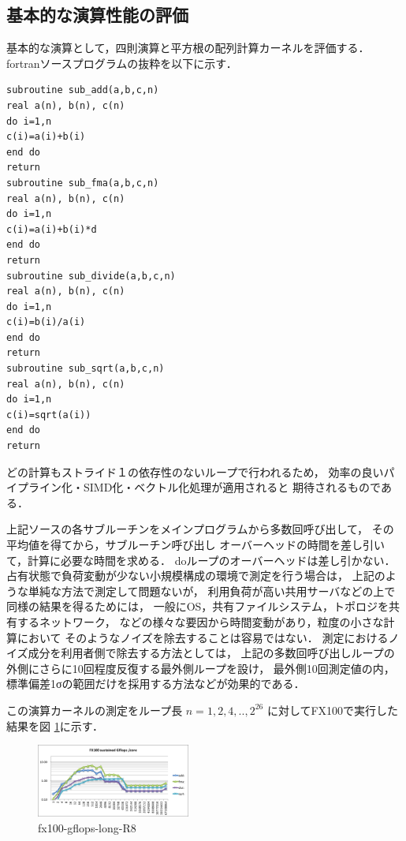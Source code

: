 \documentclass[submit,techrep,noauthor]{ipsj}
\begin{document}
\subsection{基本的な演算性能の評価}

基本的な演算として，四則演算と平方根の配列計算カーネルを評価する．
fortranソースプログラムの抜粋を以下に示す．

\begin{lstlisting}
subroutine sub_add(a,b,c,n)
real a(n), b(n), c(n)  
do i=1,n
c(i)=a(i)+b(i)
end do
return
subroutine sub_fma(a,b,c,n)
real a(n), b(n), c(n)  
do i=1,n
c(i)=a(i)+b(i)*d
end do
return
subroutine sub_divide(a,b,c,n)
real a(n), b(n), c(n)  
do i=1,n
c(i)=b(i)/a(i)
end do
return
subroutine sub_sqrt(a,b,c,n)
real a(n), b(n), c(n)  
do i=1,n
c(i)=sqrt(a(i))
end do
return
\end{lstlisting}
どの計算もストライド１の依存性のないループで行われるため，
効率の良いパイプライン化・SIMD化・ベクトル化処理が適用されると
期待されるものである．

上記ソースの各サブルーチンをメインプログラムから多数回呼び出して，
その平均値を得てから，サブルーチン呼び出し
オーバーヘッドの時間を差し引いて，計算に必要な時間を求める．
doループのオーバーヘッドは差し引かない．
占有状態で負荷変動が少ない小規模構成の環境で測定を行う場合は，
上記のような単純な方法で測定して問題ないが，
利用負荷が高い共用サーバなどの上で同様の結果を得るためには，
一般にOS，共有ファイルシステム，トポロジを共有するネットワーク，
などの様々な要因から時間変動があり，粒度の小さな計算において
そのようなノイズを除去することは容易ではない．
測定におけるノイズ成分を利用者側で除去する方法としては，
上記の多数回呼び出しループの外側にさらに10回程度反復する最外側ループを設け，
最外側10回測定値の内，標準偏差1σの範囲だけを採用する方法などが効果的である．

この演算カーネルの測定をループ長
\begin{math}
n=1,2,4,..,2^{26}
\end{math}
に対してFX100で実行した結果を図 \ref{fig:fx100-gflops-long-R8}に示す．
\begin{figure}[bt]
\centering\includegraphics[width=0.45\textwidth]{figs/fx100-gflops-long-R8}
\caption{fx100-gflops-long-R8}
\label{fig:fx100-gflops-long-R8}
\end{figure}
\end{document}
